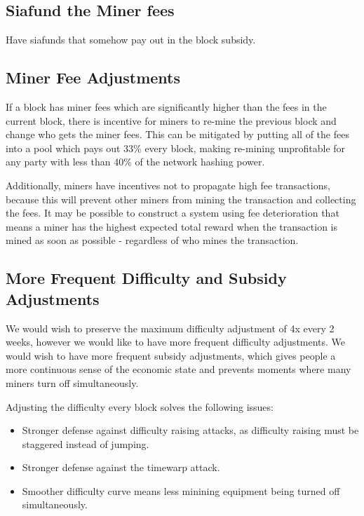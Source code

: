 \documentclass[twocolumn]{article}
\begin{document}
\subsection{Siafund the Miner fees}
Have siafunds that somehow pay out in the block subsidy.

\subsection{Miner Fee Adjustments}
If a block has miner fees which are significantly higher than the fees in the current block, there is incentive for miners to re-mine the previous block and change who gets the miner fees.
This can be mitigated by putting all of the fees into a pool which pays out 33\% every block, making re-mining unprofitable for any party with less than 40\% of the network hashing power.

Additionally, miners have incentives not to propagate high fee transactions, because this will prevent other miners from mining the transaction and collecting the fees.
It may be possible to construct a system using fee deterioration that means a miner has the highest expected total reward when the transaction is mined as soon as possible - regardless of who mines the transaction.

\subsection{More Frequent Difficulty and Subsidy Adjustments}
We would wish to preserve the maximum difficulty adjustment of 4x every 2 weeks, however we would like to have more frequent difficulty adjustments.
We would wish to have more frequent subsidy adjustments, which gives people a more continuous sense of the economic state and prevents moments where many miners turn off simultaneously.

Adjusting the difficulty every block solves the following issues:
\begin{itemize}
	\item Stronger defense against difficulty raising attacks, as difficulty raising must be staggered instead of jumping.
	\item Stronger defense against the timewarp attack.
	\item Smoother difficulty curve means less minining equipment being turned off simultaneously.
\end{itemize}

\end{document}
